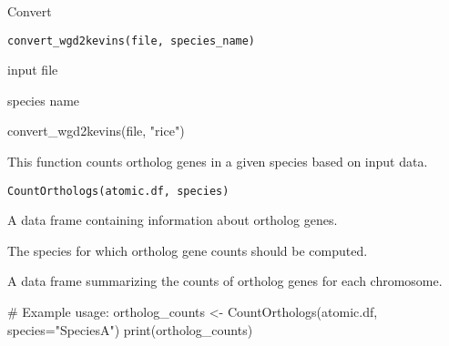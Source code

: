 \documentclass[a4paper]{book}
\begin{document}
%
\begin{Description}\relax
Convert
\end{Description}
%
\begin{Usage}
\begin{verbatim}
convert_wgd2kevins(file, species_name)
\end{verbatim}
\end{Usage}
%
\begin{Arguments}
\begin{ldescription}
\item[\code{file}] input file

\item[\code{species\_name}] species name
\end{ldescription}
\end{Arguments}
%
\begin{Examples}
\begin{ExampleCode}
convert_wgd2kevins(file, "rice")
\end{ExampleCode}
\end{Examples}
%
\begin{Description}\relax
This function counts ortholog genes in a given species based on input data.
\end{Description}
%
\begin{Usage}
\begin{verbatim}
CountOrthologs(atomic.df, species)
\end{verbatim}
\end{Usage}
%
\begin{Arguments}
\begin{ldescription}
\item[\code{atomic.df}] A data frame containing information about ortholog genes.

\item[\code{species}] The species for which ortholog gene counts should be computed.
\end{ldescription}
\end{Arguments}
%
\begin{Value}
A data frame summarizing the counts of ortholog genes for each chromosome.
\end{Value}
%
\begin{Examples}
\begin{ExampleCode}
# Example usage:
ortholog_counts <- CountOrthologs(atomic.df, species="SpeciesA")
print(ortholog_counts)
\end{ExampleCode}
\end{Examples}
\end{document}
